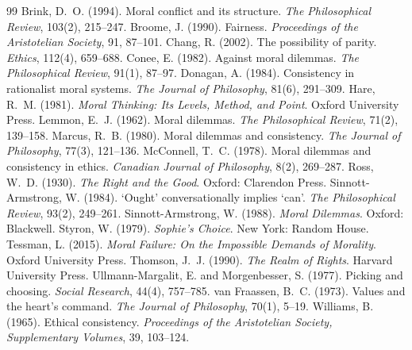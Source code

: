 \documentclass{situationist-preprint}
\begin{document}
\begin{thebibliography}{99}\small
{} Brink, D.~O. (1994). Moral conflict and its structure. \emph{The Philosophical Review}, 103(2), 215--247.
 Broome, J. (1990). Fairness. \emph{Proceedings of the Aristotelian Society}, 91, 87--101.
 Chang, R. (2002). The possibility of parity. \emph{Ethics}, 112(4), 659--688.
 Conee, E. (1982). Against moral dilemmas. \emph{The Philosophical Review}, 91(1), 87--97.
 Donagan, A. (1984). Consistency in rationalist moral systems. \emph{The Journal of Philosophy}, 81(6), 291--309.
 Hare, R.~M. (1981). \emph{Moral Thinking: Its Levels, Method, and Point}. Oxford University Press.
 Lemmon, E.~J. (1962). Moral dilemmas. \emph{The Philosophical Review}, 71(2), 139--158.
 Marcus, R.~B. (1980). Moral dilemmas and consistency. \emph{The Journal of Philosophy}, 77(3), 121--136.
 McConnell, T.~C. (1978). Moral dilemmas and consistency in ethics. \emph{Canadian Journal of Philosophy}, 8(2), 269--287.
 Ross, W.~D. (1930). \emph{The Right and the Good}. Oxford: Clarendon Press.
 Sinnott-Armstrong, W. (1984). `Ought' conversationally implies `can'. \emph{The Philosophical Review}, 93(2), 249--261.
 Sinnott-Armstrong, W. (1988). \emph{Moral Dilemmas}. Oxford: Blackwell.
 Styron, W. (1979). \emph{Sophie's Choice}. New York: Random House.
 Tessman, L. (2015). \emph{Moral Failure: On the Impossible Demands of Morality}. Oxford University Press.
 Thomson, J.~J. (1990). \emph{The Realm of Rights}. Harvard University Press.
 Ullmann-Margalit, E. and Morgenbesser, S. (1977). Picking and choosing. \emph{Social Research}, 44(4), 757--785.
 van Fraassen, B.~C. (1973). Values and the heart's command. \emph{The Journal of Philosophy}, 70(1), 5--19.
 Williams, B. (1965). Ethical consistency. \emph{Proceedings of the Aristotelian Society, Supplementary Volumes}, 39, 103--124.
\end{thebibliography}
\end{document}
